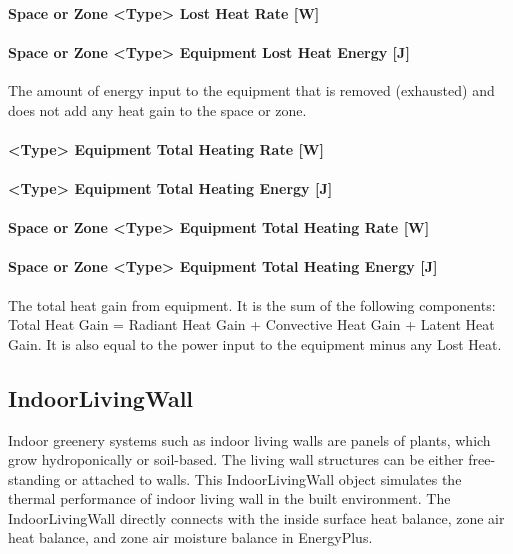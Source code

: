 \paragraph{Space or Zone <Type> Lost Heat Rate {[}W{]}}\label{zone-equipment-lost-heating-rate-w}

\paragraph{Space or Zone <Type> Equipment Lost Heat Energy {[}J{]}}\label{zone-equipment-lost-heating-energy-j}

The amount of energy input to the equipment that is removed (exhausted) and does not add any heat gain to the space or zone.

\paragraph{<Type> Equipment Total Heating Rate {[}W{]}}\label{equipment-total-heating-rate-w}

\paragraph{<Type> Equipment Total Heating Energy {[}J{]}}\label{equipment-total-heating-energy-j}

\paragraph{Space or Zone <Type> Equipment Total Heating Rate {[}W{]}}\label{zone-equipment-total-heating-rate-w}

\paragraph{Space or Zone <Type> Equipment Total Heating Energy {[}J{]}}\label{zone-equipment-total-heating-energy-j}

The total heat gain from equipment. It is the sum of the following components: Total Heat Gain = Radiant Heat Gain + Convective Heat Gain + Latent Heat Gain. It is also equal to the power input to the equipment minus any Lost Heat.

\subsection{IndoorLivingWall}\label{indoorlivingwall}

Indoor greenery systems such as indoor living walls are panels of plants, which grow hydroponically or soil-based. The living wall structures can be either free-standing or attached to walls. This IndoorLivingWall object simulates the thermal performance of indoor living wall in the built environment. The IndoorLivingWall directly connects with the inside surface heat balance, zone air heat balance, and zone air moisture balance in EnergyPlus.

